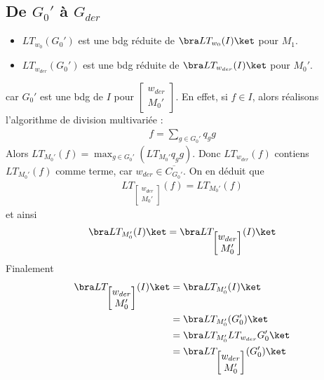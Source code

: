         \subsection{De $G_0'$ à $G_{der}$}
            \begin{itemize}
                \item $LT_{w_0}(G_0')$ est une bdg réduite de $\bra LT_{w_0}(I) \ket$ pour $M_1$.
                \item $LT_{w_{der}}(G_0')$ est une bdg réduite de $\bra LT_{w_{der}}(I) \ket$ pour $M_0'$.
            \end{itemize}
            car $G_0'$ est une bdg de $I$ pour $\begin{bmatrix} w_{der} \\ M_0' \end{bmatrix}$. En effet, si $f \in I$, alors réalisons l'algorithme de division multivariée :
            \begin{align}
                f = \sum_{g \in G_0'} q_gg
            \end{align}
            Alors $LT_{M_0'}(f) = \max_{g \in G_0'}(LT_{M_0'} q_gg)$. Donc $LT_{w_{der}}(f)$ contiens $LT_{M_0'}(f)$ comme terme, car $w_{der} \in \overline{C_{G_0'}}$. On en déduit que
            \begin{align*}
                LT_{\begin{bmatrix} w_{der} \\ M_0' \end{bmatrix}}(f) = LT_{M_0'}(f)
            \end{align*}
            et ainsi
            \begin{align*}
                \bra LT_{M_0'}(I) \ket = \bra LT_{\begin{bmatrix} w_{der} \\ M_0' \end{bmatrix}}(I) \ket
            \end{align*}
            Finalement
            \begin{align*}
                \bra LT_{\begin{bmatrix} w_{der} \\ M_0' \end{bmatrix}}(I) \ket &= \bra LT_{M_0'}(I) \ket \\
                &= \bra LT_{M_0'}(G_0') \ket \\
                &= \bra LT_{M_0'} LT_{w_{der}} G_0' \ket \\
                &= \bra LT_{\begin{bmatrix} w_{der} \\ M_0' \end{bmatrix}}(G_0') \ket
            \end{align*}
